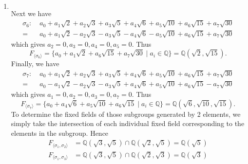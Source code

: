 \documentclass[12pt]{article}
\makeatletter
\theoremstyle{definition}
\theoremstyle{remark}
\newenvironment{solution}[1][\bf{\textit{Solution}}]{\par
  
  \normalfont \topsep6\p@\@plus6\p@\relax
  \list{}{\leftmargin=0mm
          \rightmargin=4mm
          \settowidth{\itemindent}{\itshape#1}%
          \labelwidth=\itemindent
          \parsep=0pt \listparindent=\parindent 
  }
  \item[\hskip\labelsep
        \itshape
    #1\@addpunct{.}]\ignorespaces
}{%
  \popQED\endlist\@endpefalse
}
\makeatother
\begin{document}
\begin{enumerate}[leftmargin=*]
\begin{enumerate}
\begin{solution}
\begin{equation*}
                            \end{equation*}
                        Next we have
                            \begin{align*}
                                \sigma_6:\; &a_0+a_1\sqrt{2}+a_2\sqrt{3}+a_3\sqrt{5}+a_4\sqrt{6}+a_5\sqrt{10}+a_6\sqrt{15}+a_7\sqrt{30} \\
                                =&a_0+a_1\sqrt{2}-a_2\sqrt{3}-a_3\sqrt{5}-a_4\sqrt{6}-a_5\sqrt{10}+a_6\sqrt{15}+a_7\sqrt{30}
                            \end{align*}
                        which gives $a_2=0,a_3=0,a_4=0,a_5=0$. Thus
                            \begin{equation*}
                                F_{\langle\sigma_6\rangle}=\{a_0+a_1\sqrt{2}+a_6\sqrt{15}+a_7\sqrt{30}\mid a_i\in\mathbb{Q}\}=\mathbb{Q}(\sqrt{2},\sqrt{15}).
                            \end{equation*}\newpage
                        Finally, we have
                            \begin{align*}
                                \sigma_7:\; &a_0+a_1\sqrt{2}+a_2\sqrt{3}+a_3\sqrt{5}+a_4\sqrt{6}+a_5\sqrt{10}+a_6\sqrt{15}+a_7\sqrt{30} \\
                                =&a_0-a_1\sqrt{2}-a_2\sqrt{3}-a_3\sqrt{5}+a_4\sqrt{6}+a_5\sqrt{10}+a_6\sqrt{15}-a_7\sqrt{30}
                            \end{align*}
                        which gives $a_1=0,a_2=0,a_3=0,a_7=0$. Thus
                            \begin{equation*}
                                F_{\langle\sigma_7\rangle}=\{a_0+a_4\sqrt{6}+a_5\sqrt{10}+a_6\sqrt{15}\mid a_i\in\mathbb{Q}\}=\mathbb{Q}(\sqrt{6},\sqrt{10},\sqrt{15}).
                            \end{equation*}
                        To determine the fixed fields of those subgroups generated by 2 elements, we simply take the intersection of each individual fixed field corresponding to the elements in the subgroup. Hence
                            \begin{equation*}
                                \begin{split}
                                    F_{\langle\sigma_1,\sigma_2\rangle}&=\mathbb{Q}(\sqrt{3},\sqrt{5})\cap\mathbb{Q}(\sqrt{2},\sqrt{5})=\mathbb{Q}(\sqrt{5}) \\
                                    F_{\langle\sigma_1,\sigma_3\rangle}&=\mathbb{Q}(\sqrt{3},\sqrt{5})\cap\mathbb{Q}(\sqrt{2},\sqrt{3})=\mathbb{Q}(\sqrt{3}) \\

\end{split}
\end{equation*}
\end{solution}
\end{enumerate}
\end{enumerate}
\end{document}
